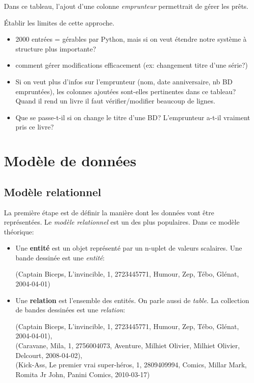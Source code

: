 \documentclass[a4paper,11pt]{article}
\begin{document}
\begin{Form}
Dans ce tableau, l'ajout d'une colonne \emph{emprunteur} permettrait de gérer les prêts.
\begin{activite}
Établir les limites de cette approche.
\end{activite}
\begin{commentprof}
\begin{itemize}
\item 2000 entrées = gérables par Python, mais si on veut étendre notre système à structure plus importante?
\item comment gérer modifications efficacement (ex: changement titre d'une série?)
\item Si on veut plus d'infos sur l'emprunteur (nom, date anniversaire, nb BD empruntées), les colonnes ajoutées sont-elles pertinentes dans ce tableau? Quand il rend un livre il faut vérifier/modifier beaucoup de lignes.
\item Que se passe-t-il si on change le titre d'une BD? L'emprunteur a-t-il vraiment pris ce livre?
\end{itemize}
\end{commentprof}
\section{Modèle de données}
\subsection{Modèle relationnel}
La première étape est de définir la manière dont les données vont être représentées. Le \emph{modèle relationnel} est un des plus populaires. Dans ce modèle théorique:
\begin{itemize}
\item Une \textbf{entité} est un objet représenté par un n-uplet de valeurs scalaires. Une bande dessinée est une \emph{entité}:
\begin{center}
(Captain Biceps, L'invincible, 1, 2723445771, Humour, Zep, Tébo, Glénat, 2004-04-01)
\end{center}
\item Une \textbf{relation} est l'ensemble des entités. On parle aussi de \emph{table}. La collection  de bandes dessinées est une \emph{relation}:
\begin{center}
(Captain Biceps, L'invincible, 1, 2723445771, Humour, Zep, Tébo, Glénat, 2004-04-01),\\
\small{(Caravane, Mila, 1, 2756004073, Aventure, Milhiet Olivier, Milhiet Olivier, Delcourt, 2008-04-02)},\\
(Kick-Ass, Le premier vrai super-héros, 1, 2809409994, Comics, Millar Mark, Romita Jr John, Panini Comics, 2010-03-17)


\end{center}
\end{itemize}
\end{Form}
\end{document}
